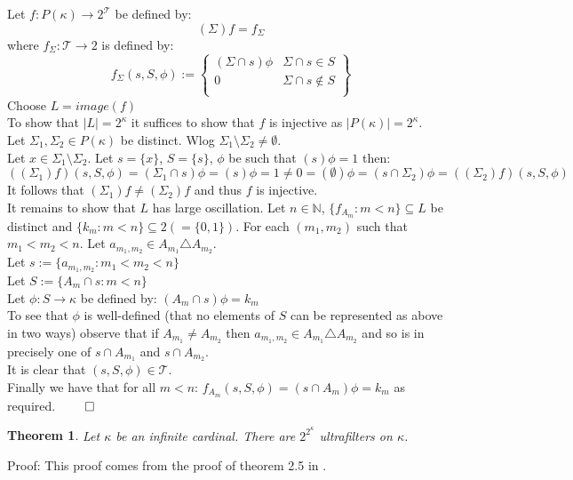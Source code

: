 \documentclass{report}
\newtheorem{theorem}{Theorem}[section]
\begin{document}
Let $f:P(\kappa) \rightarrow 2^\mathcal{T}$ be defined by:
$$(\Sigma)f = f_\Sigma$$
where $f_\Sigma:\mathcal{T} \rightarrow 2$ is defined by:
$$f_\Sigma(s,S,\phi):=\left\{
    \begin{array}{lr}
      (\Sigma \cap s)\phi &  \Sigma \cap s \in S\\
      0 &  \Sigma \cap s \notin S\\
    \end{array}
    \right\}$$
Choose $L = image(f)$\\
To show that $\vert L \vert = 2^\kappa$ it suffices to show that $f$ is injective as $\vert P(\kappa) \vert = 2^\kappa$.\\
Let $\Sigma_1, \Sigma_2 \in P(\kappa)$ be distinct. Wlog $\Sigma_1 \text{\textbackslash} \Sigma_2 \neq \emptyset $.\\
Let $x \in \Sigma_1 \text{\textbackslash} \Sigma_2$. Let $s= \{x\}$, $S= \{s\}$, $\phi$ be such that $(s)\phi = 1$ then:
$$((\Sigma_1)f)(s,S,\phi)=(\Sigma_1 \cap s)\phi=(s)\phi= 1 \neq 0 = (\emptyset)\phi=(s\cap \Sigma_2)\phi=((\Sigma_2)f)(s,S,\phi)$$
It follows that $(\Sigma_1)f \neq (\Sigma_2)f$ and thus $f$ is injective.\\
It remains to show that $L$ has large oscillation. Let $n \in \mathbb{N}$, $\{f_{A_m}:m<n\}\subseteq L$ be distinct and $\{k_m:m<n\}\subseteq 2(=\{0,1\})$. For each $(m_1,m_2)$ such that $m_1<m_2<n$. Let $a_{m_1,m_2}\in A_{m_1} \triangle A_{m_2}$.\\
 Let $s:=\{a_{m_1,m_2}:m_1 < m_2 < n\}$\\
 Let $S:=\{A_m \cap s: m<n\}$\\
 Let $\phi:S \rightarrow \kappa$ be defined by: $(A_m \cap s)\phi = k_m$\\
 To see that $\phi$ is well-defined (that no  elements of $S$ can be represented as above in two ways) observe that if $A_{m_1} \neq A_{m_2}$ then $a_{m_1,m_2}\in A_{m_1} \triangle A_{m_2}$ and so is in precisely one of $s\cap A_{m_1}$ and $s\cap A_{m_2}$.\\
 It is clear that $(s,S,\phi)\in \mathcal{T}$.\\
Finally we have that for all $m<n$:
$f_{A_m}(s,S,\phi)= (s\cap A_m)\phi = k_m$
as required. $\qed$
\begin{theorem}\label{lots of ultrafilters}
Let $\kappa$ be an infinite cardinal. There are $2^{2^\kappa}$ ultrafilters on $\kappa$.
\end{theorem}\par
Proof: This proof comes from the proof of theorem 2.5 in \cite{no ultrafilters}.\\
\end{document}

